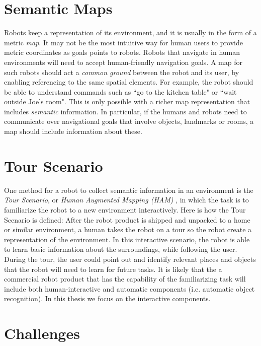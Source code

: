 \documentclass[12pt]{gatech-thesis}
\begin{document}
\section{Semantic Maps}
\label{sec:semantic_maps}

Robots keep a representation of its environment, and it is usually in the form of a metric \textit{map}. It may not be the most intuitive way for human users to provide metric coordinates as goals points to robots. Robots that navigate in human environments will need to accept human-friendly navigation goals. A map for such robots should act a \textit{common ground} between the robot and its user, by enabling referencing to the same spatial elements. For example, the robot should be able to understand commands such as ``go to the kitchen table" or ``wait outside Joe's room". This is only possible with a richer map representation that includes \textit{semantic} information. In particular, if the humans and robots need to communicate over navigational goals that involve objects, landmarks or rooms, a map should include information about these.

\section{Tour Scenario}
\label{sec:tour_scenario}

One method for a robot to collect semantic information in an environment is the \textit{Tour Scenario}, or \textit{Human Augmented Mapping (HAM)} \cite{topp2008human}, in which the task is to familiarize the robot to a new environment interactively. Here is how the Tour Scenario is defined: After the robot product is shipped and unpacked to a home or similar environment, a human takes the robot on a tour so the robot create a representation of the environment. In this interactive scenario, the robot is able to learn basic information about the surroundings, while following the user. During the tour, the user could point out and identify relevant places and objects that the robot will need to learn for future tasks. It is likely that the a commercial robot product that has the capability of the familiarizing task will include both human-interactive and automatic components (i.e. automatic object recognition). In this thesis we focus on the interactive components.

\section{Challenges}
\end{document}
